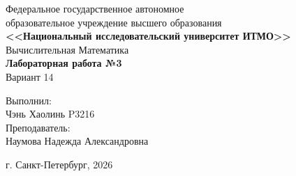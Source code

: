 \begin{titlepage}
    \centering
    Федеральное государственное автономное \\
    образовательное учреждение высшего образования \\
    \textbf{<<Национальный исследовательский университет ИТМО>>} \\

    \vfill
    Вычислительная Математика \\
    \vspace{0.5\baselineskip}
    \textbf{Лабораторная работа №3} \\
    \vspace{0.5\baselineskip}
    Вариант 14 \\

    \vfill

    \flushright
    Выполнил:\\ 
    Чэнь Хаолинь P3216\\
    Преподаватель:\\
    Наумова Надежда Александровна\\

    \vspace{4\baselineskip}
    
    \centering
    г. Санкт-Петербург, 2026

\end{titlepage}